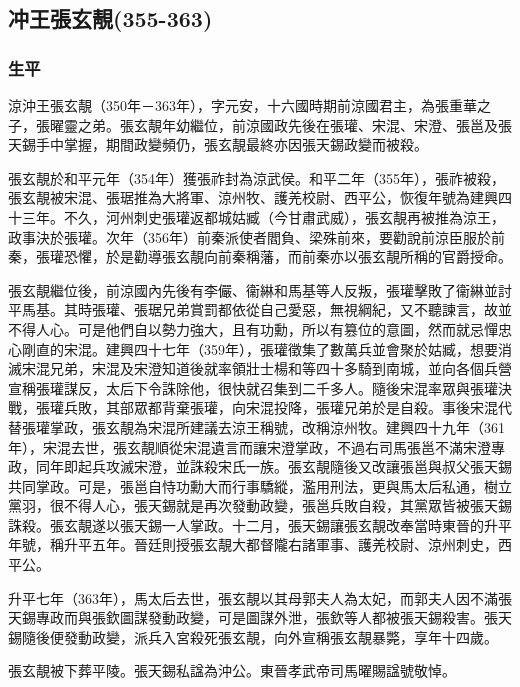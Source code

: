 
\subsection{冲王張玄靚\tiny(355-363)}

\subsubsection{生平}

涼沖王張玄靚（350年－363年），字元安，十六國時期前涼國君主，為張重華之子，張曜靈之弟。張玄靚年幼繼位，前涼國政先後在張瓘、宋混、宋澄、張邕及張天錫手中掌握，期間政變頻仍，張玄靚最終亦因張天錫政變而被殺。

張玄靚於和平元年（354年）獲張祚封為涼武侯。和平二年（355年），張祚被殺，張玄靚被宋混、張琚推為大將軍、涼州牧、護羌校尉、西平公，恢復年號為建興四十三年。不久，河州刺史張瓘返都城姑臧（今甘肅武威），張玄靚再被推為涼王，政事決於張瓘。次年（356年）前秦派使者閻負、梁殊前來，要勸說前涼臣服於前秦，張瓘恐懼，於是勸導張玄靚向前秦稱藩，而前秦亦以張玄靚所稱的官爵授命。

張玄靚繼位後，前涼國內先後有李儼、衞綝和馬基等人反叛，張瓘擊敗了衞綝並討平馬基。其時張瓘、張琚兄弟賞罰都依從自己愛惡，無視綱紀，又不聽諫言，故並不得人心。可是他們自以勢力強大，且有功勳，所以有篡位的意圖，然而就忌憚忠心剛直的宋混。建興四十七年（359年），張瓘徵集了數萬兵並會聚於姑臧，想要消滅宋混兄弟，宋混及宋澄知道後就率領壯士楊和等四十多騎到南城，並向各個兵營宣稱張瓘謀反，太后下令誅除他，很快就召集到二千多人。隨後宋混率眾與張瓘決戰，張瓘兵敗，其部眾都背棄張瓘，向宋混投降，張瓘兄弟於是自殺。事後宋混代替張瓘掌政，張玄靚為宋混所建議去涼王稱號，改稱涼州牧。建興四十九年（361年），宋混去世，張玄靚順從宋混遺言而讓宋澄掌政，不過右司馬張邕不滿宋澄專政，同年即起兵攻滅宋澄，並誅殺宋氏一族。張玄靚隨後又改讓張邕與叔父張天錫共同掌政。可是，張邕自恃功勳大而行事驕縱，濫用刑法，更與馬太后私通，樹立黨羽，很不得人心，張天錫就是再次發動政變，張邕兵敗自殺，其黨眾皆被張天錫誅殺。張玄靚遂以張天錫一人掌政。十二月，張天錫讓張玄靚改奉當時東晉的升平年號，稱升平五年。晉廷則授張玄靚大都督隴右諸軍事、護羌校尉、涼州刺史，西平公。

升平七年（363年），馬太后去世，張玄靚以其母郭夫人為太妃，而郭夫人因不滿張天錫專政而與張欽圖謀發動政變，可是圖謀外泄，張欽等人都被張天錫殺害。張天錫隨後便發動政變，派兵入宮殺死張玄靚，向外宣稱張玄靚暴斃，享年十四歲。

張玄靚被下葬平陵。張天錫私諡為沖公。東晉孝武帝司馬曜賜諡號敬悼。

